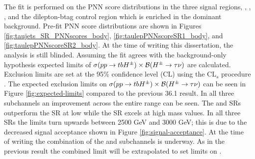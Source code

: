 		The fit is performed on the \gls{PNN} score distributions in the three signal regions, \taujets, \tauel, \taumu, and the dilepton-btag control region which is enriched in the dominant \ttbar background. Pre-fit \gls{PNN} score distributions are shown in Figures \ref{fig:taujets_SR_PNNscores_body}, \ref{fig:taulepPNNscoreSR1_body}, and \ref{fig:taulepPNNscoreSR2_body}. At the time of writing this dissertation, the analysis is still blinded. Assuming the fit agrees with the background-only hypothesis expected limits of $\sigma(pp \to tbH^{\pm})\times \mathrm{\cal{B}}(H^{\pm} \to \tau \nu)$ are calculated. Exclusion limits are set at the 95\% confidence level (CL) using the $\mathrm{CL}_s$ procedure \cite{CL-setting}. The expected exclusion limits on $\sigma(pp \to tbH^{\pm})\times \mathrm{\cal{B}}(H^{\pm} \to \tau \nu)$ can be seen in Figure \ref{fig:expected-limits} compared to the previous 36.1 \ifb result. In all three subchannels an improvement across the entire \mHpm range can be seen. The \tauel and \taumu \glspl{SR} outperform the \taujets \gls{SR} at low \mHpm while the \taujets \gls{SR} excels at high mass values. In all three \glspl{SR} the limits turn upwards between 2500 GeV and 3000 GeV; this is due to the decreased signal acceptance shown in Figure \ref{fig:signal-acceptance}. At the time of writing the combination of the \taulep and \taujets subchannels is underway. As in the previous result \cite{hpm-previous} the combined limit will be extrapolated to set limits on \tanb.

